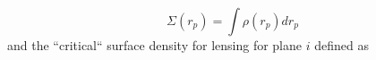 \begin{equation}
\Sigma(r_p) = \int \rho(r_p) dr_p
\end{equation}
and the ``critical`` surface density for lensing for plane $i$ defined as
  
  